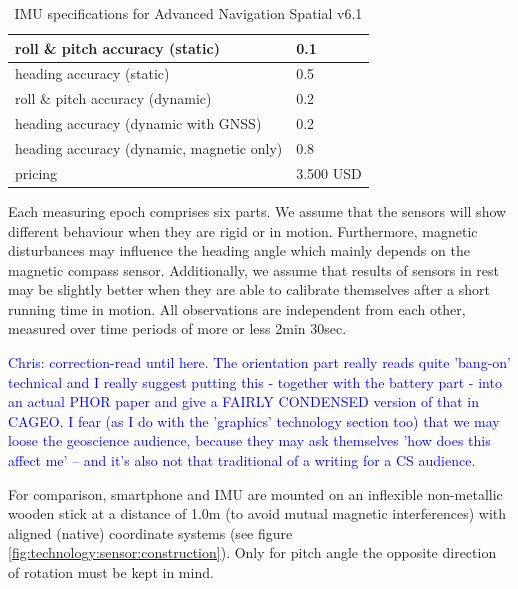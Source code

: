 \documentclass[review]{elsarticle}
\begin{document}
\begin{center}
\begin{small}
\begin{longtable}[HT]{| p{8cm} | p{2cm} |}
	\caption{\gls{IMU} specifications for Advanced Navigation Spatial v6.1}
	\label{table:sensor:imu}
	\endhead
		\hline
		roll \& pitch accuracy (static) & 0.1 \\ \hline
		heading accuracy (static) & 0.5 \\ \hline
		roll \& pitch accuracy (dynamic) & 0.2 \\ \hline
		heading accuracy (dynamic with \gls{GNSS}) & 0.2 \\ \hline
		heading accuracy (dynamic, magnetic only) & 0.8 \\ \hline
		pricing & 3.500 USD                                                                  \\ \hline
\end{longtable}
\end{small}
\end{center}



Each measuring epoch comprises six parts. We assume that the sensors will show different behaviour when they are rigid or in motion. Furthermore, magnetic disturbances may influence the heading angle which mainly depends on the magnetic compass sensor. Additionally, we assume that results of sensors in rest may be slightly better when they are able to calibrate themselves after a short running time in motion. All observations are independent from each other, measured over time periods of more or less 2min 30sec. 

\textcolor{blue}{Chris: correction-read until here. The orientation part really reads quite 'bang-on' technical and I really suggest putting this - together with the battery part - into an actual PHOR paper and give a FAIRLY CONDENSED version of that in CAGEO. I fear (as I do with the 'graphics' technology section too) that we may loose the geoscience audience, because they may ask themselves 'how does this affect me' -- and it's also not that traditional of a writing for a CS audience.}

For comparison, smartphone and \gls{IMU} are mounted on an inflexible non-metallic wooden stick at a distance of 1.0m (to avoid mutual magnetic interferences) with aligned (native) coordinate systems (see figure \ref{fig:technology:sensor:construction}). Only for pitch angle the opposite direction of rotation must be kept in mind.  
\end{document}
